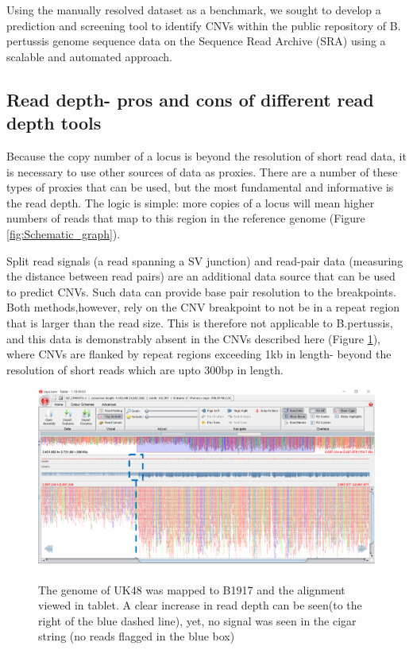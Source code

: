 \documentclass{article}
\begin{document}
Using the manually resolved dataset as a benchmark, we sought to develop a prediction and screening tool to identify CNVs within the public repository of B. pertussis genome sequence data on the Sequence Read Archive (SRA) using a scalable and automated approach.

\subsection{Read depth- pros and cons of different read depth tools}
Because the copy number of a locus is beyond the resolution of short read data, it is necessary to use other sources of data as proxies. There are a number of these types of proxies that can be used, but the most fundamental and informative is the read depth. The logic is simple: more copies of a locus will mean higher numbers of reads that map to this region in the reference genome (Figure \ref{fig:Schematic_graph}).

Split read signals (a read spanning a SV junction) and read-pair data (measuring the distance between read pairs) are an additional data source that can be used to predict CNVs. Such data can provide base pair resolution to the breakpoints. Both methods,however, rely on the CNV breakpoint to not be in a repeat region that is larger than the read size. This is therefore not applicable to B.pertussis, and this data is demonstrably absent in the CNVs described here (Figure \ref{fig:Close_but_no_cigar}), where CNVs are flanked by repeat regions exceeding 1kb in length- beyond the resolution of short reads which are upto 300bp in length. 


\begin{figure}[h!]
\centering
\includegraphics[width=\textwidth{}]{Chapter_1/tablet.png}
\caption{The genome of UK48 was mapped to B1917 and the alignment viewed in tablet. A clear increase in read depth can be seen(to the right of the blue dashed line), yet, no signal was seen in the cigar string (no reads flagged in the blue box)}
\label{fig:Close_but_no_cigar}
\end{figure}
\end{document}
